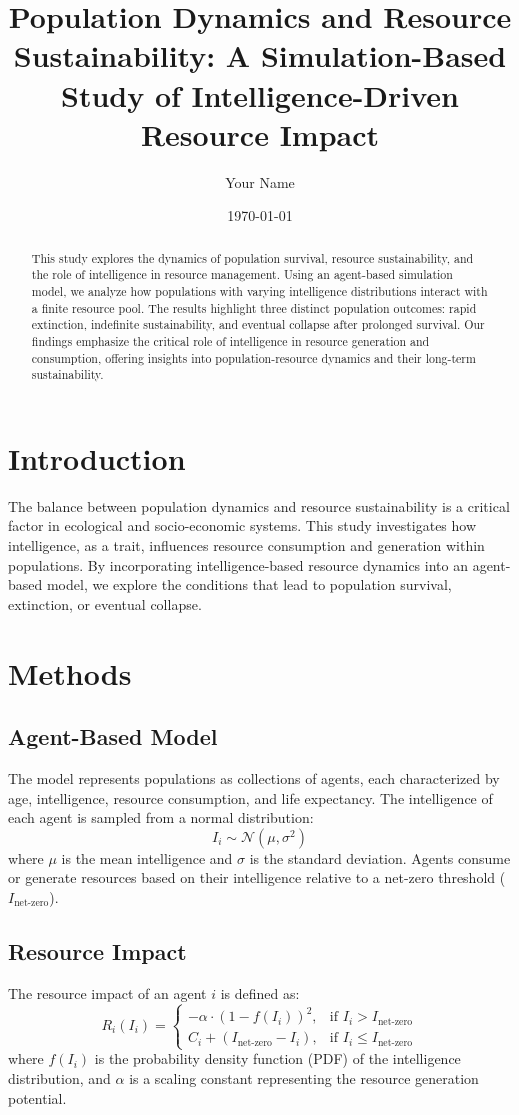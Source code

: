 \documentclass[12pt]{article}
\title{Population Dynamics and Resource Sustainability: A Simulation-Based Study of Intelligence-Driven Resource Impact}
\author{Your Name}
\date{\today}
\begin{document}
\maketitle

\begin{abstract}
This study explores the dynamics of population survival, resource sustainability, and the role of intelligence in resource management. Using an agent-based simulation model, we analyze how populations with varying intelligence distributions interact with a finite resource pool. The results highlight three distinct population outcomes: rapid extinction, indefinite sustainability, and eventual collapse after prolonged survival. Our findings emphasize the critical role of intelligence in resource generation and consumption, offering insights into population-resource dynamics and their long-term sustainability.
\end{abstract}

\section{Introduction}
The balance between population dynamics and resource sustainability is a critical factor in ecological and socio-economic systems. This study investigates how intelligence, as a trait, influences resource consumption and generation within populations. By incorporating intelligence-based resource dynamics into an agent-based model, we explore the conditions that lead to population survival, extinction, or eventual collapse.

\section{Methods}
\subsection{Agent-Based Model}
The model represents populations as collections of agents, each characterized by age, intelligence, resource consumption, and life expectancy. The intelligence of each agent is sampled from a normal distribution:
\[
I_i \sim \mathcal{N}(\mu, \sigma^2)
\]
where \( \mu \) is the mean intelligence and \( \sigma \) is the standard deviation. Agents consume or generate resources based on their intelligence relative to a net-zero threshold (\( I_\text{net-zero} \)).

\subsection{Resource Impact}
The resource impact of an agent \( i \) is defined as:
\[
R_i(I_i) = 
\begin{cases} 
-\alpha \cdot (1 - f(I_i))^2, & \text{if } I_i > I_\text{net-zero} \\
C_i + (I_\text{net-zero} - I_i), & \text{if } I_i \leq I_\text{net-zero}
\end{cases}
\]
where \( f(I_i) \) is the probability density function (PDF) of the intelligence distribution, and \( \alpha \) is a scaling constant representing the resource generation potential.
\end{document}
